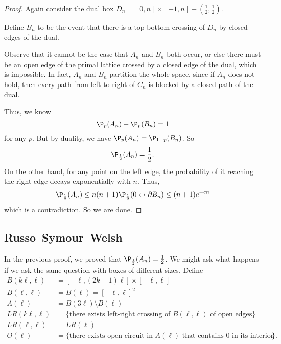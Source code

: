 \documentclass[a4paper]{article}
\begin{document}
\begin{proof}
  Again consider the dual box $D_n = [0, n] \times [-1, n] + \left(\frac{1}{2}, \frac{1}{2}\right)$.
  \begin{center}
  \end{center}
  Define $B_n$ to be the event that there is a top-bottom crossing of $D_n$ by closed edges of the dual.

  Observe that it cannot be the case that $A_n$ and $B_n$ both occur, or else there must be an open edge of the primal lattice crossed by a closed edge of the dual, which is impossible. In fact, $A_n$ and $B_n$ partition the whole space, since if $A_n$ does not hold, then every path from left to right of $C_n$ is blocked by a closed path of the dual.

  Thus, we know
  \[
    \P_p(A_n) + \P_p(B_n) = 1
  \]
  for any $p$. But by duality, we have $\P_p(A_n) = \P_{1 - p}(B_n)$. So
  \[
    \P_{\frac{1}{2}} (A_n) = \frac{1}{2}.
  \]
  On the other hand, for any point on the left edge, the probability of it reaching the right edge decays exponentially with $n$. Thus,
  \[
    \P_{\frac{1}{2}}(A_n) \leq n (n + 1) \P_{\frac{1}{2}}(0 \leftrightarrow \partial B_n) \leq (n + 1) e^{-cn}
  \]
  which is a contradiction. So we are done.
\end{proof}

\subsection{Russo--Symour--Welsh}
In the previous proof, we proved that $\P_{\frac{1}{2}}(A_n) = \frac{1}{2}$. We might ask what happens if we ask the same question with boxes of different sizes. Define
\begin{align*}
  B(k\ell, \ell) &= [-\ell, (2k - 1)\ell] \times [-\ell, \ell]\\
  B(\ell, \ell) &= B(\ell) = [-\ell, \ell]^2\\
  A(\ell) &= B(3\ell) \setminus B(\ell)\\
  LR(k\ell ,\ell) &= \{\text{there exists left-right crossing of $B(\ell, \ell)$ of open edges}\}\\
  LR(\ell, \ell) &= LR(\ell)\\
  O(\ell) &= \{\text{there exists open circuit in $A(\ell)$ that contains $0$ in its interior}\}.
\end{align*}
\end{document}
